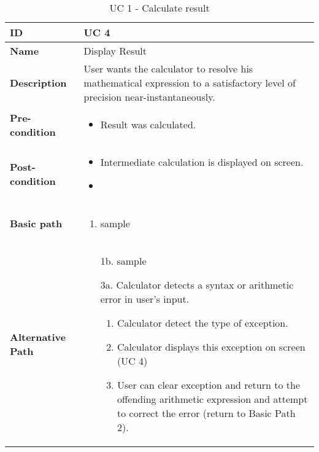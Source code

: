 \documentclass{article}
\begin{document}
\begin{table}[!h]
\begin{tabular}{|p{3cm}|p{9cm}|}
\hline
\textbf{ID} & UC 4  \\ \hline
\textbf{Name} & Display Result  \\ \hline
\textbf{Description} & User wants the calculator to resolve his mathematical expression to a satisfactory level of precision near-instantaneously.  \\ \hline
\textbf{Pre-condition} &
	\begin{itemize}
		\vspace{-2mm}
		\item Result was calculated.
		\vspace{-3.5mm}
	\end{itemize}  \\ \hline
\textbf{Post-condition} &
	\begin{itemize}
		\vspace{-2mm}
		\item Intermediate calculation is displayed on screen.
		\item 
		\vspace{-3.5mm}
	\end{itemize}  \\ \hline
\textbf{Basic path} &
	\begin{enumerate}
		\vspace{-2mm}
		\item sample
		\vspace{-3.5mm}
	\end{enumerate}  \\ \hline
\textbf{Alternative Path} &
	\begin{itemize}[leftmargin=6mm]
		\vspace{-2mm}
		\item [1b.] sample
		\item [3a.] Calculator detects a syntax or arithmetic error in user's input.
			\begin{enumerate}
				\item Calculator detect the type of exception.
				\item Calculator displays this exception on screen (UC 4)
				\item User can clear exception and return to the offending arithmetic expression and attempt to correct the error (return to Basic Path 2).
			\end{enumerate}
		
		\vspace{-3.5mm}
	\end{itemize}  \\ \hline
\end{tabular}
\caption{UC 1 - Calculate result}
\end{table}
\end{document}
